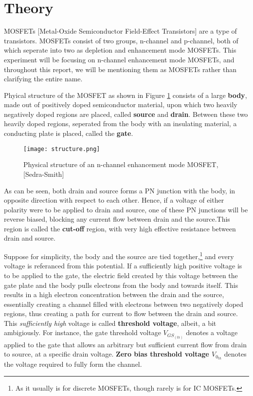 \documentclass[../main.tex]{subfiles}
\begin{document}
\section{Theory}

    MOSFETs [Metal-Oxide Semiconductor Field-Effect Transistors] are a type of transistors.
    MOSFETs consist of two groups, n-channel and p-channel, both of which seperate into two 
    as depletion and enhancement mode MOSFETs. This experiment will be focusing on 
    n-channel enhancement mode MOSFETs, and throughout this report, we will be mentioning 
    them as MOSFETs rather than clarifying the entire name.

    Phyical structure of the MOSFET as shown in Figure \ref{fig:structure} consists of a large 
    \textbf{body}, made out of positively doped semiconductor material, upon which two heavily 
    negatively doped regions are placed, called \textbf{source} and \textbf{drain}. Between these 
    two heavily doped regions, seperated from the body with an insulating material, a conducting 
    plate is placed, called the \textbf{gate}. 

    \begin{figure}[H]\centering
        \texttt{[image: structure.png]}
        \caption{Physical structure of an n-channel enhancement mode MOSFET, [Sedra-Smith]}\label{fig:structure}
    \end{figure}

    As can be seen, both drain and source forms a PN junction 
    with the body, in opposite direction with respect to each other. Hence, if a voltage of either polarity were 
    to be applied to drain and source, one of these PN junctions will be reverse biased, blocking any current flow
    between drain and the source.\footnotemark This region is called the \textbf{cut-off} region, with very high effective 
    resistance between drain and source.

    Suppose for simplicity, the body and the source are tied together,\footnote{As it usually is for discrete MOSFETs, though rarely is for IC MOSFETs.} 
    and every voltage is referanced from this potential.
    If a sufficiently high positive voltage is to be applied to the gate, the electric field created by this voltage 
    between the gate plate and the body pulls electrons from the body and towards itself. This results in a high electron
    concentration between the drain and the source, essentially creating a channel filled with electrons between two 
    negatively doped regions, thus creating a path for current to flow between the drain and source. This \textit{sufficiently high}
    voltage is called \textbf{threshold voltage}, albeit, a bit ambigiously. For instance, the gate threshold voltage 
    \textbf{$V_{GS_{(th)}}$} denotes a voltage applied to the gate that allows an arbitrary but sufficient current flow 
    from drain to source, at a specific drain voltage. \textbf{Zero bias threshold voltage $V_{0_{th}}$} denotes 
    the voltage required to fully form the channel.
    
\end{document}
